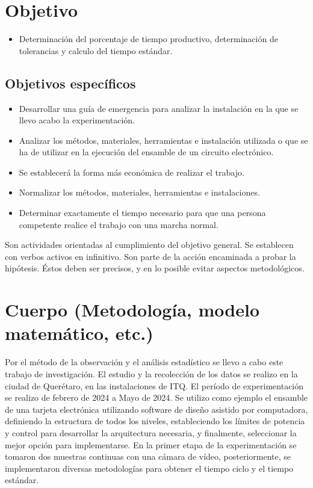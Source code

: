     \section{Objetivo}
    
    \begin{itemize}
        \item Determinación del porcentaje de tiempo productivo, determinación de tolerancias y calculo del tiempo estándar.
    \end{itemize}
    
    \subsection{Objetivos específicos }
    
    \begin{itemize}
        \item Desarrollar una guía de emergencia para analizar la instalación en la que se llevo acabo la experimentación.
        \item Analizar los métodos, materiales, herramientas e instalación utilizada o que se ha de utilizar en la ejecución del ensamble de un circuito electrónico.
        \item Se establecerá la forma más económica de realizar el trabajo.
        \item Normalizar los métodos, materiales, herramientas e instalaciones.
        \item Determinar exactamente el tiempo necesario para que una persona competente realice el trabajo con una marcha normal.
    \end{itemize}
    
    Son actividades orientadas al cumplimiento del objetivo general. Se establecen con verbos activos en infinitivo. Son parte de la acción encaminada a probar la hipótesis. Éstos deben ser precisos, y en lo posible evitar aspectos metodológicos.
    \section{Cuerpo (Metodología, modelo matemático, etc.)}
    
    Por el método de la observación y el análisis estadístico se llevo a cabo este trabajo de investigación.
    El estudio y la recolección de los datos se realizo en la ciudad de Querétaro, en las instalaciones de ITQ. 
    El período de experimentación se realizo de febrero de 2024 a Mayo de 2024.
    Se utilizo como ejemplo el ensamble de una tarjeta electrónica utilizando software de diseño asistido por computadora, definiendo la estructura de todos los niveles, estableciendo los límites de potencia y control para desarrollar la arquitectura necesaria, y finalmente, seleccionar la mejor opción para implementarse. 
    En la primer etapa de la experimentación se tomaron dos muestras continuas con una cámara de vídeo, posteriormente, se implementaron diversas metodologías para obtener el tiempo ciclo y el tiempo estándar. 
    
